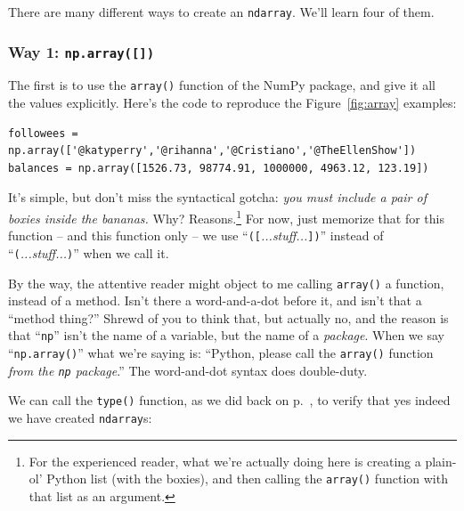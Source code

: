 There are many different ways to create an \texttt{ndarray}. We'll learn four
of them.

\subsubsection{Way 1: \texttt{np.array([])}}

\label{arrayFunction}

The first is to use the \texttt{array()} function of the NumPy package, and
give it all the values explicitly. Here's the code to reproduce the
Figure~\ref{fig:array} examples:

\begin{Verbatim}[fontsize=\scriptsize,samepage=true,frame=single,framesep=3mm]
followees = np.array(['@katyperry','@rihanna','@Cristiano','@TheEllenShow'])
balances = np.array([1526.73, 98774.91, 1000000, 4963.12, 123.19])
\end{Verbatim}

It's simple, but don't miss the syntactical gotcha: \textit{you must include a
pair of boxies inside the bananas.} Why? Reasons.\footnote{For the experienced
reader, what we're actually doing here is creating a plain-ol' Python list
(with the boxies), and then calling the \texttt{array()} function with that
list as an argument.} For now, just memorize that for this function -- and this
function only -- we use ``\texttt{([}\textsl{...stuff...}\texttt{])}'' instead
of ``\texttt{(}\textsl{...stuff...}\texttt{)}'' when we call it.

By the way, the attentive reader might object to me calling \texttt{array()} a
function, instead of a method. Isn't there a word-and-a-dot before it, and
isn't that a ``method thing?'' Shrewd of you to think that, but actually no,
and the reason is that ``\texttt{np}'' isn't the name of a variable, but the
name of a \textit{package}. When we say ``\texttt{np.array()}'' what we're
saying is: ``Python, please call the \texttt{array()} function \textit{from the
\texttt{np} package}.'' The word-and-dot syntax does double-duty.

\label{arrayType}
We can call the \texttt{type()} function, as we did back on
p.~\pageref{typeFunction}, to verify that yes indeed we have created
\texttt{ndarray}s:

